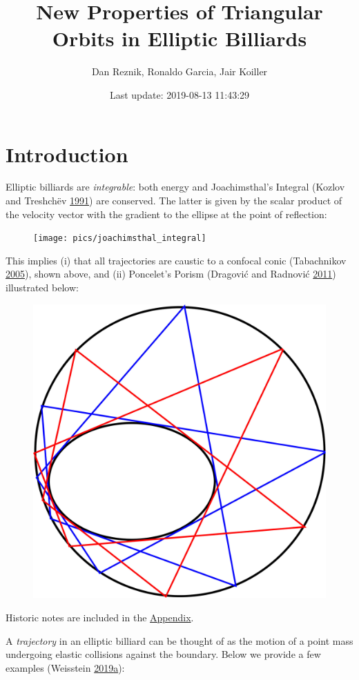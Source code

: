 \documentclass[]{article}
\title{New Properties of Triangular Orbits in Elliptic Billiards}
\author{Dan Reznik, Ronaldo Garcia, Jair Koiller}
\date{Last update: 2019-08-13 11:43:29}
\begin{document}
\maketitle

\hypertarget{introduction}{%
\section{Introduction}\label{introduction}}

Elliptic billiards are \emph{integrable}: both energy and Joachimsthal's Integral (Kozlov and Treshchëv \protect\hyperlink{ref-kozlov91}{1991}) are conserved. The latter is given by the scalar product of the velocity vector with the gradient to the ellipse at the point of reflection:

\begin{figure}[H]

{\centering \texttt{[image: pics/joachimsthal\_integral]} 

}

\end{figure}

This implies (i) that all trajectories are caustic to a confocal conic (Tabachnikov \protect\hyperlink{ref-sergei91}{2005}), shown above, and (ii) Poncelet's Porism (Dragović and Radnović \protect\hyperlink{ref-dragovic11}{2011}) illustrated below:

\begin{figure}[H]

{\centering \includegraphics[width=0.5\linewidth]{pics/porism} 

}

\end{figure}

Historic notes are included in the \href{appendices.html}{Appendix}.

A \emph{trajectory} in an elliptic billiard can be thought of as the motion of a point mass undergoing elastic collisions against the boundary. Below we provide a few examples (Weisstein \protect\hyperlink{ref-mw}{2019}\protect\hyperlink{ref-mw}{a}):
\end{document}
